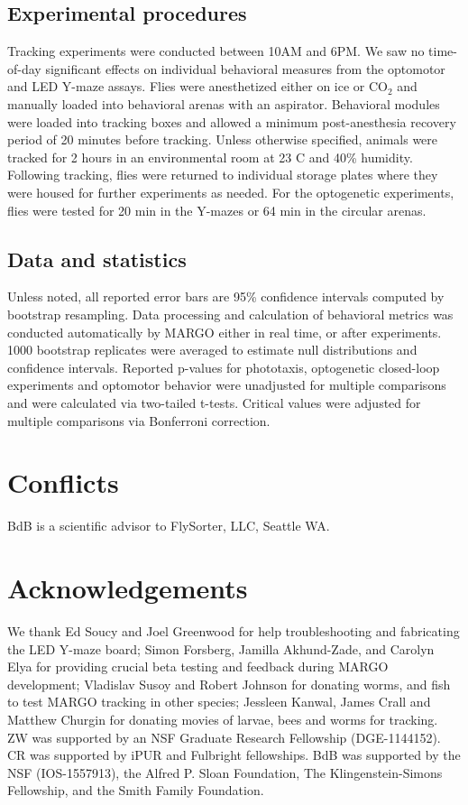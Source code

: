 \documentclass[10pt,letterpaper]{article}
\begin{document}
\subsection*{Experimental procedures}

Tracking experiments were conducted between 10AM and 6PM. We saw no time-of-day significant effects on individual behavioral measures from the optomotor and LED Y-maze assays. Flies were anesthetized either on ice or CO$_{2}$ and manually loaded into behavioral arenas with an aspirator. Behavioral modules were loaded into tracking boxes and allowed a minimum post-anesthesia recovery period of 20 minutes before tracking. Unless otherwise specified, animals were tracked for 2 hours in an environmental room at 23 C and 40\% humidity. Following tracking, flies were returned to individual storage plates where they were housed for further experiments as needed. For the optogenetic experiments, flies were tested for 20 min in the Y-mazes or 64 min in the circular arenas.

\subsection*{Data and statistics}

Unless noted, all reported error bars are 95\% confidence intervals computed by bootstrap resampling. Data processing and calculation of behavioral metrics was conducted automatically by MARGO either in real time, or after experiments. 1000 bootstrap replicates were averaged to estimate null distributions and confidence intervals. Reported p-values for phototaxis, optogenetic closed-loop experiments and optomotor behavior were unadjusted for multiple comparisons and were calculated via two-tailed t-tests. Critical values were adjusted for multiple comparisons via Bonferroni correction.

\section*{Conflicts}

BdB is a scientific advisor to FlySorter, LLC, Seattle WA.

\section*{Acknowledgements}

We thank Ed Soucy and Joel Greenwood for help troubleshooting and fabricating the LED Y-maze board; Simon Forsberg, Jamilla Akhund-Zade, and Carolyn Elya for providing crucial beta testing and feedback during MARGO development; Vladislav Susoy and Robert Johnson for donating worms, and fish to test MARGO tracking in other species; Jessleen Kanwal, James Crall and Matthew Churgin for donating movies of larvae, bees and worms for tracking. ZW was supported by an NSF Graduate Research Fellowship (DGE-1144152). CR was supported by iPUR and Fulbright fellowships. BdB was supported by the NSF (IOS-1557913), the Alfred P. Sloan Foundation, The Klingenstein-Simons Fellowship, and the Smith Family Foundation. 
\end{document}
